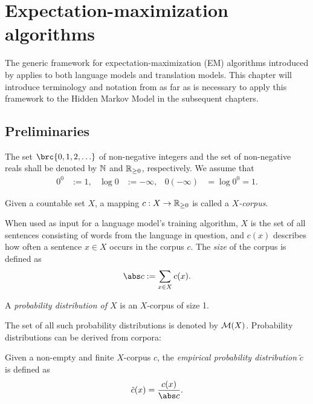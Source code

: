 \chapter{Expectation-maximization algorithms}

The generic framework for expectation-maximization (EM) algorithms introduced
by \cite{bucstuvog15} applies to both language models and translation models.
This chapter will introduce terminology and notation from \cite{bucstuvog15} as
far as is necessary to apply this framework to the Hidden Markov Model in the
subsequent chapters.

\section{Preliminaries}

The set $\brc{0,1,2,\ldots}$ of non-negative integers and the set of
non-negative reals shall be denoted by $\mathbb N$ and $\mathbb R_{\geq0}$, respectively.
We assume that
\begin{align*}
 0^0 &:= 1, &
 \log 0 &:= -\infty, &
 0 (-\infty) &= \log 0^0 = 1.
\end{align*}

\begin{definition}
 Given a countable set $X$, a mapping $c: X \to \mathbb R_{\geq0}$ is called a
 \emph{$X$-corpus}.
\end{definition}

When used as input for a language model's training algorithm, $X$ is the set of
all sentences consisting of words from the language in question, and $c(x)$
describes how often a sentence $x\in X$ occurs in the corpus $c$. The
\emph{size} of the corpus is defined as
\begin{equation*}
 \abs c := \sum_{x\in X} c(x).
\end{equation*}

\begin{definition}
 A \emph{probability distribution of $X$} is an $X$-corpus of size 1.
\end{definition}

The set of all such probability distributions is denoted by $\mathcal M(X)$.
Probability distributions can be derived from corpora:

\begin{definition}
 Given a non-empty and finite $X$-corpus $c$, the \emph{empirical probability
 distribution} $\tilde c$ is defined as
 \[
  \tilde c(x) = \frac{c(x)}{\abs c}.
 \]
\end{definition}

